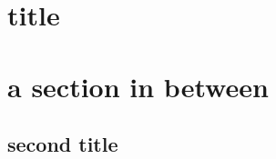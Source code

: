 \documentclass{article}
\begin{document}
    \section{title}
    \lipsum[1-2]
    
    \pagebreak
    \section{a section in between}
    \lipsum[1-2] 
    \begin{landscape}
    \section{second title}
    \lipsum[1-2]
    \end{landscape}
    
    \lipsum[1-10]
\end{document}
